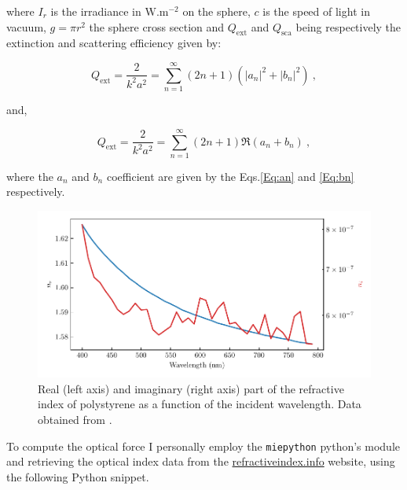 where $I_r$ is the irradiance in $\mathrm{W.m^{-2}}$ on the sphere,  $c$ is the speed of light in vacuum, $g=\pi r^2$ the sphere cross section and  $Q_\mathrm{ext}$ and $Q_\mathrm{sca}$ being respectively the extinction and scattering efficiency given by:

\begin{equation}
	Q_\mathrm{ext} = \frac{2}{k^2 a^2} = \sum _{n=1} ^\infty (2n + 1 ) (|a_n|^2 + |b_n|^2) ~,
\end{equation}

and,

\begin{equation}
	Q_\mathrm{ext} = \frac{2}{k^2 a^2} = \sum _{n=1} ^\infty (2n + 1 ) \Re (a_n + b_n) ~,
\end{equation}

where the $a_n$ and $b_n$ coefficient are given by the Eqs.\ref{Eq:an} and \ref{Eq:bn} respectively.


\begin{figure}[H]
	\centering
	\includegraphics[scale=0.9]{02_body/chapter2/images/Calcul_force_optique/refractive_index.pdf}
	\caption{Real (left axis) and imaginary (right axis) part of the refractive index of polystyrene as a function of the incident wavelength. Data obtained from \cite{zhang_complex_2020}.  \href{https://github.com/eXpensia/Confined-Brownian-Motion/blob/main/02_body/chapter2/images/Calcul_force_optique/Calcul\%20optical\%20force.ipynb}{\faGithub}}
	\label{fig:refractive_index}
\end{figure}

To compute the optical force I personally employ the \texttt{miepython} python's module \href{https://github.com/scottprahl/miepython/}{\faGithub} and retrieving the optical index data from the \href{https://refractiveindex.info/?shelf=organic&book=polystyren&page=Zhang}{refractiveindex.info} website, using the following Python snippet.


